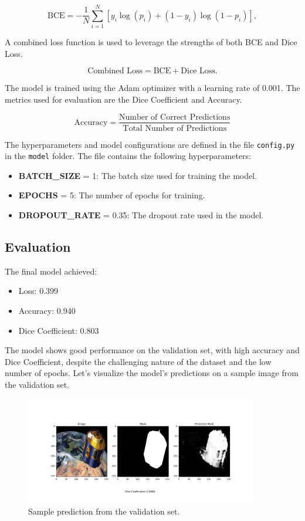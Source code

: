 \documentclass{article}
\begin{document}
\[
\text{BCE} = -\frac{1}{N} \sum_{i=1}^{N} [y_i \log(p_i) + (1 - y_i) \log(1 - p_i)],
\]

A combined loss function is used to leverage the strengths of both BCE and Dice Loss.

\[
\text{Combined Loss} = \text{BCE} + \text{Dice Loss}.
\]

The model is trained using the Adam optimizer with a learning rate of 0.001. The metrics used for evaluation 
are the Dice Coefficient and Accuracy.

\[
\text{Accuracy} = \frac{\text{Number of Correct Predictions}}{\text{Total Number of Predictions}}
\]
\vspace{1em}

The hyperparameters and model configurations are defined in the file \texttt{config.py} in the \texttt{model} folder.
The file contains the following hyperparameters:
 
\begin{itemize}
    \item \textbf{BATCH\_SIZE} = 1: The batch size used for training the model.
    \item \textbf{EPOCHS} = 5: The number of epochs for training.
    \item \textbf{DROPOUT\_RATE} = 0.35: The dropout rate used in the model.
\end{itemize}

\subsection{Evaluation}
The final model achieved:
\begin{itemize}
    \item Loss: 0.399
    \item Accuracy: 0.940
    \item Dice Coefficient: 0.803
\end{itemize}

The model shows good performance on the validation set, with high accuracy and Dice Coefficient, 
despite the challenging nature of the dataset and the low number of epochs. Let's visualize the model's 
predictions on a sample image from the validation set.

\begin{figure}[h]
    \centering
    \includegraphics[width=0.9\textwidth]{../images/output_sample.png}
    \caption{Sample prediction from the validation set.}
    \label{fig:sample_predictions}
\end{figure}
\end{document}
